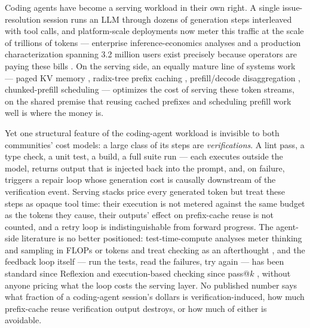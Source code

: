 \documentclass[11pt]{article}
\begin{document}
Coding agents have become a serving workload in their own right. A single issue-resolution session runs an LLM through dozens of generation steps interleaved with tool calls, and platform-scale deployments now meter this traffic at the scale of trillions of tokens --- enterprise inference-economics analyses and a production characterization spanning 3.2 million users exist precisely because operators are paying these bills \citep{CopilotScale2608,InferenceEcon2607}. On the serving side, an equally mature line of systems work --- paged KV memory \citep{Kwon2023vLLM}, radix-tree prefix caching \citep{Zheng2023SGLang}, prefill/decode disaggregation \citep{Zhong2024DistServe,Qin2024Mooncake}, chunked-prefill scheduling \citep{Agrawal2024Sarathi} --- optimizes the cost of serving these token streams, on the shared premise that reusing cached prefixes and scheduling prefill work well is where the money is.

Yet one structural feature of the coding-agent workload is invisible to both communities' cost models: a large class of its steps are \emph{verifications}. A lint pass, a type check, a unit test, a build, a full suite run --- each executes outside the model, returns output that is injected back into the prompt, and, on failure, triggers a repair loop whose generation cost is causally downstream of the verification event. Serving stacks price every generated token but treat these steps as opaque tool time: their execution is not metered against the same budget as the tokens they cause, their outputs' effect on prefix-cache reuse is not counted, and a retry loop is indistinguishable from forward progress. The agent-side literature is no better positioned: test-time-compute analyses meter thinking and sampling in FLOPs or tokens and treat checking as an afterthought \citep{Brown2024Monkeys,Snell2024TestTime}, and the feedback loop itself --- run the tests, read the failures, try again --- has been standard since Reflexion \citep{Shinn2023Reflexion} and execution-based checking since pass@$k$ \citep{Chen2021Codex}, without anyone pricing what the loop costs the serving layer. No published number says what fraction of a coding-agent session's dollars is verification-induced, how much prefix-cache reuse verification output destroys, or how much of either is avoidable.
\end{document}
